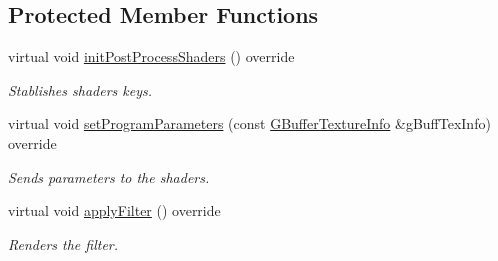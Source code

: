 \subsection*{Protected Member Functions}
\begin{DoxyCompactItemize}
\item 
\mbox{\label{class_geometry_engine_1_1_geometry_post_process_1_1_double_pass_post_process_1_1_blur_post_process_a12fac4df2ff487e6696c08641008a3a0}} 
virtual void \mbox{\hyperlink{class_geometry_engine_1_1_geometry_post_process_1_1_double_pass_post_process_1_1_blur_post_process_a12fac4df2ff487e6696c08641008a3a0}{init\+Post\+Process\+Shaders}} () override
\begin{DoxyCompactList}\small\item\em Stablishes shaders keys. \end{DoxyCompactList}\item 
\mbox{\label{class_geometry_engine_1_1_geometry_post_process_1_1_double_pass_post_process_1_1_blur_post_process_a280fb0972fb63b1d0f283604678a7404}} 
virtual void \mbox{\hyperlink{class_geometry_engine_1_1_geometry_post_process_1_1_double_pass_post_process_1_1_blur_post_process_a280fb0972fb63b1d0f283604678a7404}{set\+Program\+Parameters}} (const \mbox{\hyperlink{struct_geometry_engine_1_1_g_buffer_texture_info}{G\+Buffer\+Texture\+Info}} \&g\+Buff\+Tex\+Info) override
\begin{DoxyCompactList}\small\item\em Sends parameters to the shaders. \end{DoxyCompactList}\item 
\mbox{\label{class_geometry_engine_1_1_geometry_post_process_1_1_double_pass_post_process_1_1_blur_post_process_a7d5a7ae52ec45c080b136c9afd13fc3c}} 
virtual void \mbox{\hyperlink{class_geometry_engine_1_1_geometry_post_process_1_1_double_pass_post_process_1_1_blur_post_process_a7d5a7ae52ec45c080b136c9afd13fc3c}{apply\+Filter}} () override
\begin{DoxyCompactList}\small\item\em Renders the filter. \end{DoxyCompactList}\item 

\end{DoxyCompactItemize}
